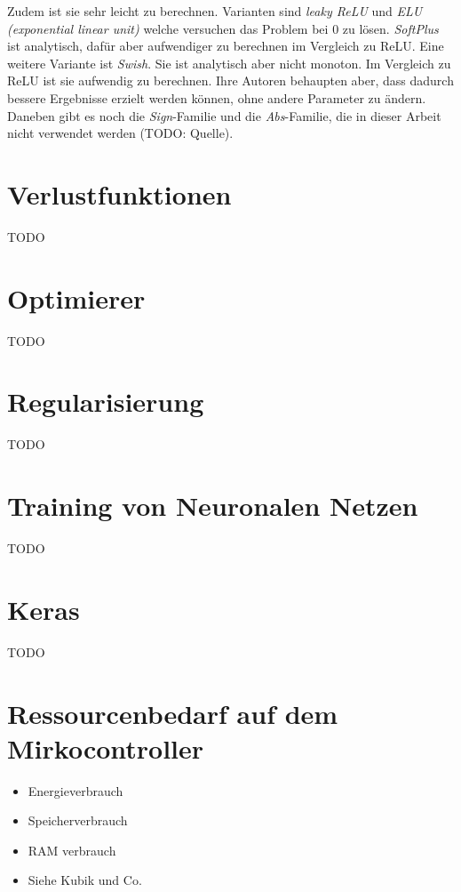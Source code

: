 Zudem ist sie sehr leicht zu berechnen.
Varianten sind \textit{leaky ReLU} und \textit{ELU (exponential linear unit)} welche versuchen das Problem bei 0 zu lösen.
\textit{SoftPlus} ist analytisch, dafür aber aufwendiger zu berechnen im Vergleich zu ReLU.
Eine weitere Variante ist \textit{Swish}. Sie ist analytisch aber nicht monoton.
Im Vergleich zu ReLU ist sie aufwendig zu berechnen.
Ihre Autoren behaupten aber, dass dadurch bessere Ergebnisse erzielt werden können, ohne andere Parameter zu ändern.
\newline
\newline
Daneben gibt es noch die \textit{Sign}-Familie und die \textit{Abs}-Familie, die in dieser Arbeit nicht verwendet werden (TODO: Quelle).

\section{Verlustfunktionen}
TODO

\section{Optimierer}
TODO

\section{Regularisierung}
TODO

\section{Training von Neuronalen Netzen}
TODO

\section{Keras}
TODO

\section{Ressourcenbedarf auf dem Mirkocontroller}
\begin{itemize}
    \item Energieverbrauch
    \item Speicherverbrauch
    \item RAM verbrauch
    \item Siehe Kubik und Co.
\end{itemize}